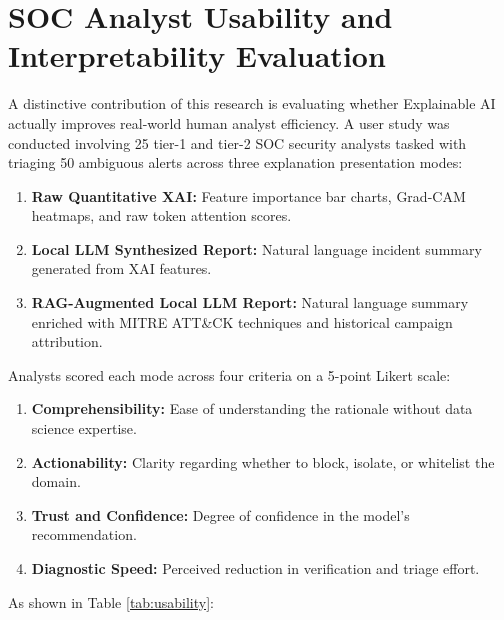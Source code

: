 \section{SOC Analyst Usability and Interpretability Evaluation}
A distinctive contribution of this research is evaluating whether Explainable AI actually improves real-world human analyst efficiency. A user study was conducted involving 25 tier-1 and tier-2 SOC security analysts tasked with triaging 50 ambiguous alerts across three explanation presentation modes:
\begin{enumerate}
\item \textbf{Raw Quantitative XAI:} Feature importance bar charts, Grad-CAM heatmaps, and raw token attention scores.
\item \textbf{Local LLM Synthesized Report:} Natural language incident summary generated from XAI features.
\item \textbf{RAG-Augmented Local LLM Report:} Natural language summary enriched with MITRE ATT\&CK techniques and historical campaign attribution.
\end{enumerate}

Analysts scored each mode across four criteria on a 5-point Likert scale:
\begin{enumerate}
\item \textbf{Comprehensibility:} Ease of understanding the rationale without data science expertise.
\item \textbf{Actionability:} Clarity regarding whether to block, isolate, or whitelist the domain.
\item \textbf{Trust and Confidence:} Degree of confidence in the model's recommendation.
\item \textbf{Diagnostic Speed:} Perceived reduction in verification and triage effort.
\end{enumerate}

As shown in Table \ref{tab:usability}:
\begin{table}[htbp]
\centering
{}
\vspace{0.2cm}
\caption{SOC Analyst Usability and Interpretability Evaluation Scores (Scale: 1--5)}
\label{tab:usability}
\end{table}

